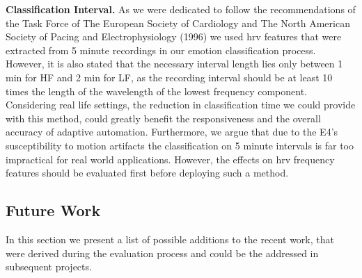\textbf{Classification Interval.}
As we were dedicated to follow the recommendations of the Task Force of The European Society of Cardiology and The North American Society of Pacing and Electrophysiology (1996) we used \gls{hrv} features that were extracted from 5 minute recordings in our emotion classification process. However, it is also stated that the necessary interval length lies only between 1 min for HF and 2 min for LF, as the recording interval should be at least 10 times the length of the wavelength of the lowest frequency component. Considering real life settings, the reduction in classification time we could provide with this method, could greatly benefit the responsiveness and the overall accuracy of adaptive automation. Furthermore, we argue that due to the E4's susceptibility to motion artifacts the classification on 5 minute intervals is far too impractical for real world applications. However, the effects on \gls{hrv} frequency features should be evaluated first before deploying such a method.
\subsection{Future Work}
In this section we present a list of possible additions to the recent work, that were derived during the evaluation process and could be the addressed in subsequent projects.

